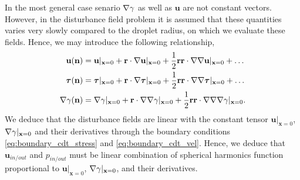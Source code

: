 In the most general case senario $\mathbf{\nabla} \gamma$ as well as $\textbf{u}$ are not constant vectors. 
However, in the disturbance field problem it is assumed that these quantities varies very slowly compared to the droplet radius, on which we evaluate these fields. 
Hence, we may introduce the following relationship,
\begin{align*}
    \textbf{u}(\textbf{n}) 
    &=  \textbf{u}|_{\textbf{x}=0}
    +  \textbf{r} \cdot  \mathbf{\nabla}\textbf{u}|_{\textbf{x}=0}
    +  \frac{1}{2}\textbf{rr} \cdot  \mathbf{\nabla}\mathbf{\nabla}\textbf{u}|_{\textbf{x}=0}
    + \ldots\\
     \bm\tau(\textbf{n}) 
    &=   \bm\tau|_{\textbf{x}=0}
    + \textbf{r} \cdot  \mathbf{\nabla} \bm\tau|_{\textbf{x}=0}
    + \frac{1}{2}\textbf{rr} \cdot  \mathbf{\nabla}\mathbf{\nabla} \bm\tau|_{\textbf{x}=0}
    + \ldots\\
    \mathbf{\nabla} \gamma (\textbf{n}) 
    &=  \mathbf{\nabla} \gamma|_{\textbf{x}=0}
    +  \textbf{r} \cdot  \mathbf{\nabla}\mathbf{\nabla} \gamma|_{\textbf{x}=0}
    +  \frac{1}{2}\textbf{rr} \cdot  \mathbf{\nabla}\mathbf{\nabla}\mathbf{\nabla} \gamma|_{\textbf{x}=0}. 
\end{align*}
We deduce that the disturbance fields are linear with the constant tensor $\textbf{u}|_{\textbf{x}=0}$, $\mathbf{\nabla} \gamma|_{\textbf{x}=0}$ and their derivatives through the boundary conditions \ref{eq:boundary_cdt_stress} and \ref{eq:boundary_cdt_vel}. 
Hence, we deduce that $\textbf{u}_{in/out}$ and $p_{in/out}$  must be linear combination of spherical harmonics function proportional to $\textbf{u}|_{\textbf{x}=0}$, $\mathbf{\nabla} \gamma|_{\textbf{x}=0}$, and their derivatives. 


